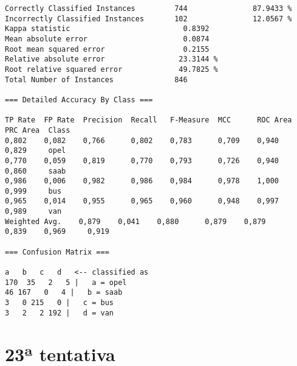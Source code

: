 \documentclass[
	article,			%
	11pt,				%
	oneside,			%
	a4paper,			%
	english,			%
	brazil,				%
	sumario=tradicional
	]{abntex2}
\begin{document}
\begin{lstlisting}
Correctly Classified Instances         744               87.9433 %
Incorrectly Classified Instances       102               12.0567 %
Kappa statistic                          0.8392
Mean absolute error                      0.0874
Root mean squared error                  0.2155
Relative absolute error                 23.3144 %
Root relative squared error             49.7825 %
Total Number of Instances              846     

=== Detailed Accuracy By Class ===

TP Rate  FP Rate  Precision  Recall   F-Measure  MCC      ROC Area  PRC Area  Class
0,802    0,082    0,766      0,802    0,783      0,709    0,940     0,829     opel
0,770    0,059    0,819      0,770    0,793      0,726    0,940     0,860     saab
0,986    0,006    0,982      0,986    0,984      0,978    1,000     0,999     bus
0,965    0,014    0,955      0,965    0,960      0,948    0,997     0,989     van
Weighted Avg.    0,879    0,041    0,880      0,879    0,879      0,839    0,969     0,919     

=== Confusion Matrix ===

a   b   c   d   <-- classified as
170  35   2   5 |   a = opel
46 167   0   4 |   b = saab
3   0 215   0 |   c = bus
3   2   2 192 |   d = van

\end{lstlisting}

\section{23ª tentativa}
\end{document}
